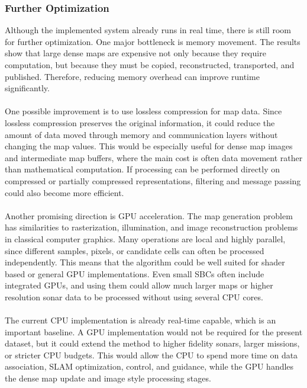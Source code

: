 \subsubsection{Further Optimization}
Although the implemented system already runs in real time, there is still room for further optimization. One major bottleneck is memory movement. The results show that large dense maps are expensive not only because they require computation, but because they must be copied, reconstructed, transported, and published. Therefore, reducing memory overhead can improve runtime significantly.
\\ \\
One possible improvement is to use lossless compression for map data. Since lossless compression preserves the original information, it could reduce the amount of data moved through memory and communication layers without changing the map values. This would be especially useful for dense map images and intermediate map buffers, where the main cost is often data movement rather than mathematical computation. If processing can be performed directly on compressed or partially compressed representations, filtering and message passing could also become more efficient.
\\ \\
Another promising direction is GPU acceleration. The map generation problem has similarities to rasterization, illumination, and image reconstruction problems in classical computer graphics. Many operations are local and highly parallel, since different samples, pixels, or candidate cells can often be processed independently. This means that the algorithm could be well suited for shader based or general GPU implementations. Even small SBCs often include integrated GPUs, and using them could allow much larger maps or higher resolution sonar data to be processed without using several CPU cores.
\\ \\
The current CPU implementation is already real-time capable, which is an important baseline. A GPU implementation would not be required for the present dataset, but it could extend the method to higher fidelity sonars, larger missions, or stricter CPU budgets. This would allow the CPU to spend more time on data association, SLAM optimization, control, and guidance, while the GPU handles the dense map update and image style processing stages.

\newpage

